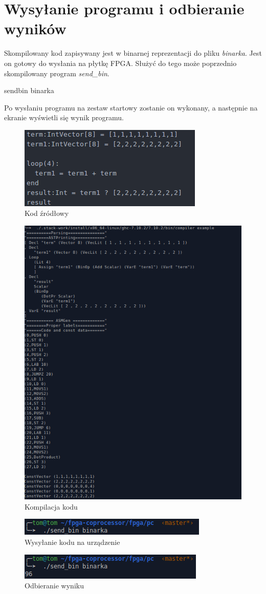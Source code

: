 \section{Wysyłanie programu i odbieranie wyników}
Skompilowany kod zapisywany jest w binarnej reprezentacji do pliku \textit{binarka}. Jest on gotowy do wysłania na płytkę FPGA. Służyć do tego może poprzednio skompilowany program \textit{send\_bin}.
\begin{center}
sendbin binarka
\end{center} 
Po wysłaniu programu na zestaw startowy zostanie on wykonany, a następnie na ekranie wyświetli się wynik programu.
\begin{figure}[!h]
\centering
\includegraphics[scale=0.75]{images/exec1}
\caption{Kod źródłowy}
\end{figure}
\begin{figure}[!h]
\centering
\includegraphics[scale=0.75]{images/exec2}
\caption{Kompilacja kodu}
\end{figure}
\begin{figure}
\centering
\includegraphics[scale=0.75]{images/exec3}
\caption{Wysyłanie kodu na urządzenie}
\end{figure}
\begin{figure}
\centering
\includegraphics[scale=0.75]{images/exec4}
\caption{Odbieranie wyniku}
\end{figure}